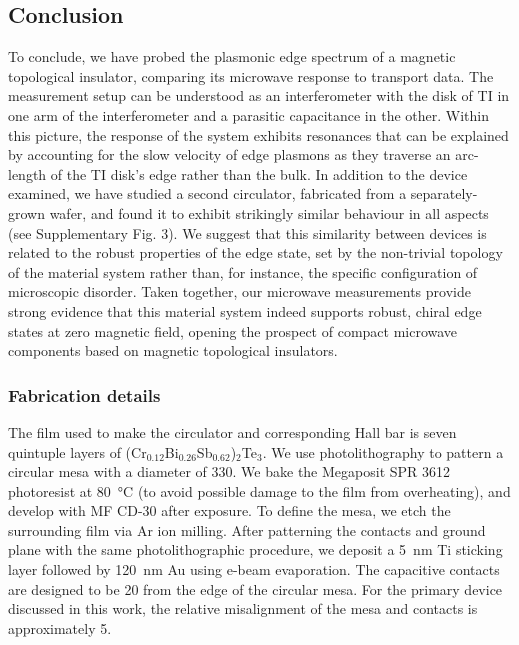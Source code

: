 \subsection{Conclusion}
To conclude, we have probed the plasmonic edge spectrum of a magnetic topological insulator, comparing its microwave response to transport data. The measurement setup can be understood as an interferometer with the disk of TI in one arm of the interferometer and a parasitic capacitance in the other. Within this picture, the response of the system exhibits resonances that can be explained by accounting for the slow velocity of edge plasmons as they traverse an arc-length of the TI disk's edge rather than the bulk. In addition to the device examined, we have studied a second circulator, fabricated from a separately-grown wafer, and found it to exhibit strikingly similar behaviour in all aspects (see Supplementary Fig. 3). We suggest that this similarity between devices is related to the robust properties of the edge state, set by the non-trivial topology of the material system rather than, for instance, the specific configuration of microscopic disorder. Taken together, our microwave measurements provide strong evidence that this material system indeed supports robust, chiral edge states at zero magnetic field, opening the prospect of compact microwave components based on magnetic topological insulators.

\subsubsection{Fabrication details}
The film used to make the circulator and corresponding Hall bar is seven quintuple layers of (Cr$_{0.12}$Bi$_{0.26}$Sb$_{0.62}$)$_2$Te$_3$. We use photolithography to pattern a circular mesa with a diameter of \SI{330}{\micron}. We bake the Megaposit SPR 3612 photoresist at \SI{80}{\celsius} (to avoid possible damage to the film from overheating), and develop with MF CD-30 after exposure. To define the mesa, we etch the surrounding film via Ar ion milling. After patterning the contacts and ground plane with the same photolithographic procedure, we deposit a \SI{5}{\nano\meter} Ti sticking layer followed by \SI{120}{\nano\meter} Au using e-beam evaporation. The capacitive contacts are designed to be \SI{20}{\micron} from the edge of the circular mesa. For the primary device discussed in this work, the relative misalignment of the mesa and contacts is approximately \SI{5}{\micron}.

